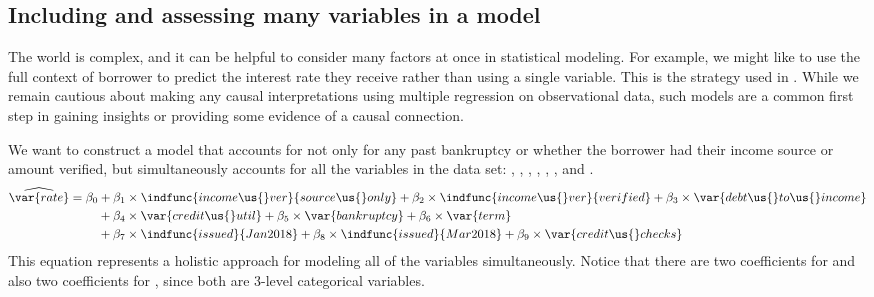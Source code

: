 \subsection{Including and assessing many variables in a model}
\label{includingAndAssessingManyVariablesInAModel}

The world is complex, and it can be helpful to
consider many factors at once in statistical modeling.
For example, we might like to use the full context of
borrower to predict the interest rate they receive
rather than using a single variable.
This is the strategy used in
.
While we remain cautious about making any causal
interpretations using multiple regression
on observational data,
such models are a common first step in gaining insights
or providing some evidence of a causal connection.

We want to construct a model that accounts for not only
for any past bankruptcy or whether the borrower had
their income source or amount verified,
but simultaneously accounts for all the variables
in the data set:
,
,
,
,
,
,
and .
\begin{align*}
\widehat{\var{rate}}
	&= \beta_0 +
	    \beta_1\times \indfunc{income\us{}ver}{source\us{}only} +
	    \beta_2\times \indfunc{income\us{}ver}{verified} +
		\beta_3\times \var{debt\us{}to\us{}income} \\
	&\qquad\  +
	    \beta_4 \times \var{credit\us{}util} +
	    \beta_5 \times \var{bankruptcy} +
		\beta_6 \times \var{term} \\
	&\qquad\  +
	    \beta_7 \times \indfunc{issued}{Jan2018} +
	    \beta_8 \times \indfunc{issued}{Mar2018} +
		\beta_9 \times \var{credit\us{}checks}
\end{align*}
This equation represents a holistic approach for modeling
all of the variables simultaneously.
Notice that there are two coefficients for 
and also two coefficients for , since both are
3-level categorical variables.



